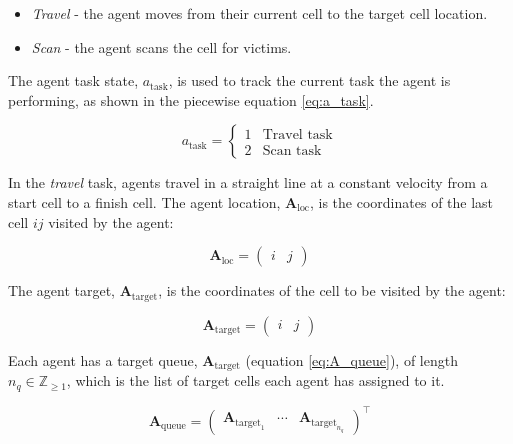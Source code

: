 \documentclass[conference]{IEEEtran}
\begin{document}
\begin{itemize}
    \item \textit{Travel} - the agent moves from their current cell to the target cell location.
    \item \textit{Scan} - the agent scans the cell for victims.
\end{itemize}

The agent task state, $a_{\text{task}}$, is used to track the current task the agent is performing, as shown in the piecewise equation \ref{eq:a_task}.

\begin{equation}
    \label{eq:a_task}
    a_{\text{task}} = 
    \begin{cases}
    1 & \text{Travel task}\\
    2 & \text{Scan task}
    \end{cases}
\end{equation}

In the \textit{travel} task, agents travel in a straight line at a constant velocity from a start cell to a finish cell.
The agent location, $\bm{A}_{\text{loc}}$, is the coordinates of the last cell $ij$ visited by the agent:

\begin{equation} \label{eq:a_l}
    \bm{A}_{\text{loc}} = 
    \begin{pmatrix}
        i & j
    \end{pmatrix}
\end{equation}

The agent target, $\bm{A}_{\text{target}}$, is the coordinates of the cell to be visited by the agent:

\begin{equation} \label{eq:A_target}
    \bm{A}_{\text{target}} = 
    \begin{pmatrix}
        i & j
    \end{pmatrix}
\end{equation}

Each agent has a target queue, $\bm{A}_{\text{target}}$ (equation \ref{eq:A_queue}), of length $n_{q} \in \mathbb{Z}_{\geq 1}$, which is the list of target cells each agent has assigned to it.

\begin{equation} \label{eq:A_queue}
    \bm{A}_{\text{queue}} =  
    \begin{pmatrix}
        \bm{A}_{\text{target}_{1}} & \cdots & \bm{A}_{\text{target}_{n_{q}}}
    \end{pmatrix}^{\intercal}
\end{equation}
\end{document}

